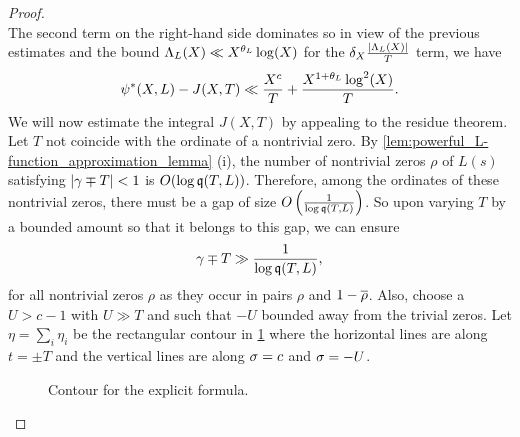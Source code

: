\begin{proof}
\[      \]
      The second term on the right-hand side dominates so in view of the previous estimates and the bound \(\Lambda_{L}(X) \ll X^{\theta_{L}}\log(X)\) for the \(\delta_{X}\frac{|\Lambda_{L}(X)|}{T}\) term, we have
      \[
        \psi^{\ast}(X,L)-J(X,T) \ll \frac{X^{c}}{T}+\frac{X^{1+\theta_{L}}\log^{2}(X)}{T}.
      \]
      We will now estimate the integral \(J(X,T)\) by appealing to the residue theorem. Let \(T\) not coincide with the ordinate of a nontrivial zero. By \cref{lem:powerful_L-function_approximation_lemma} (i), the number of nontrivial zeros \(\rho\) of \(L(s)\) satisfying \(|\gamma\mp T| < 1\) is \(O(\log\mathfrak{q}(T,L))\). Therefore, among the ordinates of these nontrivial zeros, there must be a gap of size \(O\left(\frac{1}{\log\mathfrak{q}(T,L)}\right)\). So upon varying \(T\) by a bounded amount so that it belongs to this gap, we can ensure
      \[
        \gamma\mp T \gg \frac{1}{\log\mathfrak{q}(T,L)},
      \]
      for all nontrivial zeros \(\rho\) as they occur in pairs \(\rho\) and \(1-\overline{\rho}\). Also, choose a \(U > c-1\) with \(U \gg T\) and such that \(-U\) bounded away from the trivial zeros. Let \(\eta = \sum_{i}\eta_{i}\) be the rectangular contour in \cref{fig:explict_formula_contour} where the horizontal lines are along \(t = \pm T\) and the vertical lines are along \(\sigma = c\) and \(\sigma = -U\).

      \begin{figure}[ht]
        \centering
        \caption{Contour for the explicit formula.}
        \label{fig:explict_formula_contour}
      \end{figure}


\end{proof}
